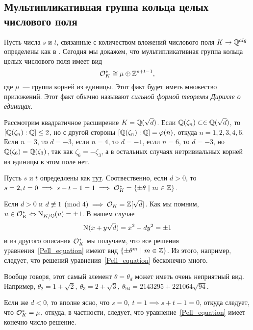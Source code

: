 	
	\subsection{Мультипликативная группа кольца целых числового поля}

	Пусть числа $s$ и $t$, связанные с количеством вложений числового поля $K \to \mathbb{Q}^{alg}$ определены как в \hyperlink{real_and_complex_inclusions}{}. Сегодня мы докажем, что мультипликативная группа кольца целых числового поля имеет вид 
	\[
		\mathcal{O}_{K}^{*} \cong \mu \oplus \mathbb{Z}^{s + t - 1},
	\]
	где $\mu$~--- группа корней из единицы. Этот факт будет иметь множество приложений. 
	Этот факт обычно называют \emph{сильной формой теоремы Дирихле о единицах}.
	

	\begin{example}
		Рассмотрим квадратичное расширение $K = \mathbb{Q}(\sqrt{d})$. Если $\mathbb{Q}(\zeta_n) \subset \in \mathbb{Q}(\sqrt{d})$, то $[\mathbb{Q}(\zeta_n) : \mathbb{Q}] \le 2$, но с другой стороны $[\mathbb{Q}(\zeta_n) : \mathbb{Q}] = \varphi(n)$, откуда $n = 1, 2, 3, 4, 6$.  Если $n = 3$, то $d = -3$, если $n = 4$, то $d = -1$, если $n = 6$, то $d = -3$, но $\mathbb{Q}(\zeta_6) = \mathbb{Q}(\zeta_3)$, так как $\zeta_6 = -\zeta_3$, а в остальных случаях нетривиальных корней из единицы в этом поле нет. 

		Пусть $s$ и $t$ опредедлены как \hyperlink{real_and_complex_inclusions}{тут}. Соотвественно, если $d > 0$, то $s = 2, t = 0 \implies s + t - 1 = 1 \implies \mathcal{O}_{K}^{*} = \{ \pm \theta \ \vert \ m \in \mathbb{Z}\}$.

		Если $d > 0$ и $d \not\equiv 1 \pmod{4} \implies \mathcal{O}_{K} = \mathbb{Z}[\sqrt{d}]$. Как мы помним, $u \in \mathcal{O}_{K}^{*} \Leftrightarrow \operatorname{\mathrm{N}}_{K/\mathbb{Q}}(u) = \pm 1$. В нашем случае 
		\begin{equation}
			\operatorname{\mathrm{N}}(x + y\sqrt{d}) = x^2 - dy^2 = \pm 1 \label{Pell_equation}
		\end{equation}
		и из другого описания $\mathcal{O}_{K}^{*}$ мы получаем, что все решения уравнения~\eqref{Pell_equation} имеют вид $\{ \pm \theta^{m} \ \vert \ m \in \mathbb{Z} \}$. Из этого, например, следует, что решений уравнения~\eqref{Pell_equation} бесконечно много. 

		Вообще говоря, этот самый элемент $\theta = \theta_{d}$ может иметь очень неприятный вид. Например, $\theta_2 = 1 + \sqrt{2}, \ \theta_3 = 2 + \sqrt{3}, \ \theta_{94} = 2143295 + 221064\sqrt{94}$.

		Если же $d < 0$, то вполне ясно, что $s = 0, \ t = 1 \implies s + t - 1 = 0$, откуда следует, что $\mathcal{O}_{K}^{*} = \mu$, откуда, в частности, следует, что уравнение~\eqref{Pell_equation} имеет конечно число решение.
	\end{example}

